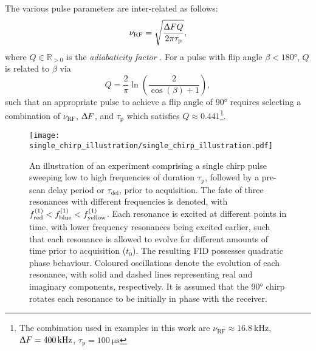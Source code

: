 The various pulse parameters are inter-related as follows:
\begin{equation}
    \nu_{\text{RF}} = \sqrt{
        \frac{\Updelta F Q}{2 \pi \tau_{\text{p}}}
    },
\end{equation}
where $Q \in \mathbb{R}_{>0}$ is the \emph{adiabaticity factor} . For a pulse with flip angle  $\beta < \ang{180}$,  $Q$ is
related to $\beta$ via
\begin{equation}
    Q = \frac{2}{\pi} \ln \left( \frac{2}{\cos(\beta) + 1} \right),
\end{equation}
such that an appropriate pulse to achieve a flip angle of \ang{90} requires
selecting a combination of $\nu_{\text{RF}}$, $\Updelta F$, and
$\tau_{\text{p}}$ which satisfies $Q \approx 0.441$\footnote{
    The combination used in examples in this work are
    $\nu_{\text{RF}} \approx \qty{16.8}{\kilo\hertz}$,
    $\Updelta F = \qty{400}{\kilo\hertz}$,
    $\tau_{\text{p}} = \qty{100}{\micro\second}$
}.

\begin{figure}
    \centering
    \texttt{[image: single\_chirp\_illustration/single\_chirp\_illustration.pdf]}
    \caption[
        An illustration of an experiment comprising a single chirp pulse.
    ]
    {
        An illustration of an experiment comprising a single chirp pulse sweeping
        low to high frequencies of duration $\tau_{\text{p}}$, followed by
        a pre-scan delay period or $\tau_{\text{del}}$, prior to
        acquisition. The fate of three resonances with different frequencies is
        denoted, with $f^{(1)}_{\text{red}} < f^{(1)}_{\text{blue}} <
        f^{(1)}_{\text{yellow}}$. Each resonance is excited at different points
        in time, with lower frequency resonances being excited earlier, such that
        each resonance is allowed to evolve for different amounts of time prior
        to acquisition ($t_0$).
        The resulting \ac{FID} possesses quadratic phase behaviour.
        Coloured oscillations denote the evolution of each resonance, with
        solid and dashed lines representing real and imaginary components,
        respectively. It is assumed that the \ang{90} chirp rotates each
        resonance to be initially in phase with the receiver.
    }
    \label{fig:single-chirp}
\end{figure}


